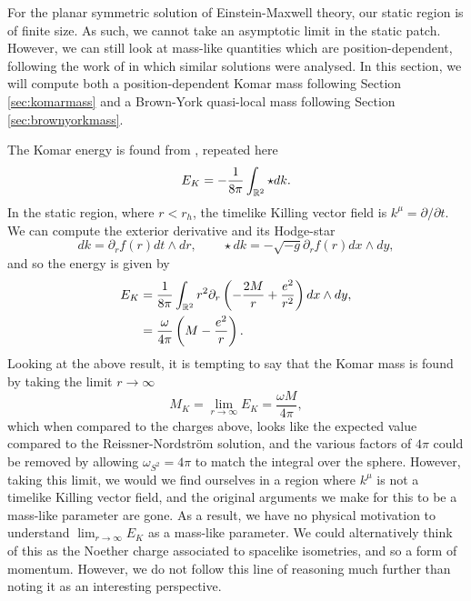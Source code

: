 For the planar symmetric solution of Einstein-Maxwell theory, our static region is of finite size. As such, we cannot take an asymptotic limit in the static patch. However, we can still look at mass-like quantities which are position-dependent, following the work of \cite{Burgess:2002vu} in which similar solutions were analysed. In this section, we will compute both a position-dependent Komar mass following Section \ref{sec:komarmass} and a Brown-York quasi-local mass following Section \ref{sec:brownyorkmass}.

The Komar energy is found from , repeated here
\begin{equation*}
	E_{K} = - \frac{1}{8\pi} \int_{{\mathbb{R}}^2} \star dk .  
\end{equation*}
In the static region, where $r < r_h$, the timelike Killing vector field is $k^\mu = \partial / \partial t$. We can compute the exterior derivative and its Hodge-star
\begin{equation*}
	dk = \partial_r f(r) dt \wedge dr, \qquad \star dk =  - \sqrt{-g}  \partial_r f(r) dx \wedge dy, 
\end{equation*}
and so the energy is given by
\begin{equation*}
\begin{aligned}
	E_K &=  \frac{1}{8\pi} \int_{{\mathbb{R}}^2} r^2  \partial_r \left( - \frac{2M}{r} + \frac{e^2}{r^2} \right) dx \wedge dy, \\
	&= \frac{\omega}{4\pi} \left(M - \frac{e^2}{r} \right)	.
\end{aligned}
\end{equation*}
Looking at the above result, it is tempting to say that the Komar mass is found by taking the limit $r \to \infty$
\begin{equation}
\label{eq:pemkomar}
	M_K = \lim_{r \rightarrow \infty} E_K = \frac{\omega M}{4\pi} ,
\end{equation}
which when compared to the charges above, looks like the expected value compared to the Reissner-Nordstr\"om solution, and the various factors of $4\pi$ could be removed by allowing $\omega_{S^2} = 4\pi$ to match the integral over the sphere. However, taking this limit, we would we find ourselves in a region where $k^\mu$ is not a timelike Killing vector field, and the original arguments we make for this to be a mass-like parameter are gone. As a result, we have no physical motivation to understand $\lim_{r \rightarrow \infty} E_K$ as a mass-like parameter. We could alternatively think of this as the Noether charge associated to spacelike isometries, and so a form of momentum. However, we do not follow this line of reasoning much further than noting it as an interesting perspective.


